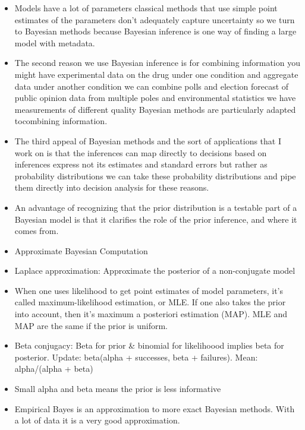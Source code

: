 \documentclass[]{book}
\begin{document}
\begin{itemize}
\item
  Models have a lot of parameters classical methods that use simple
  point estimates of the parameters don't adequately capture uncertainty
  so we turn to Bayesian methods because Bayesian inference is one way
  of finding a large model with metadata.
\item
  The second reason we use Bayesian inference is for combining
  information you might have experimental data on the drug under one
  condition and aggregate data under another condition we can combine
  polls and election forecast of public opinion data from multiple poles
  and environmental statistics we have measurements of different quality
  Bayesian methods are particularly adapted tocombining information.
\item
  The third appeal of Bayesian methods and the sort of applications that
  I work on is that the inferences can map directly to decisions based
  on inferences express not its estimates and standard errors but rather
  as probability distributions we can take these probability
  distributions and pipe them directly into decision analysis for these
  reasons.
\item
  An advantage of recognizing that the prior distribution is a testable
  part of a Bayesian model is that it clarifies the role of the prior
  inference, and where it comes from.
\item
  Approximate Bayesian Computation
\item
  Laplace approximation: Approximate the posterior of a non-conjugate
  model
\item
  When one uses likelihood to get point estimates of model parameters,
  it's called maximum-likelihood estimation, or MLE. If one also takes
  the prior into account, then it's maximum a posteriori estimation
  (MAP). MLE and MAP are the same if the prior is uniform.
\item
  Beta conjugacy: Beta for prior \& binomial for likelihoood implies
  beta for posterior. Update: beta(alpha + successes, beta + failures).
  Mean: alpha/(alpha + beta)
\item
  Small alpha and beta means the prior is less informative
\item
  Empirical Bayes is an approximation to more exact Bayesian methods.
  With a lot of data it is a very good approximation.
\end{itemize}
\end{document}
